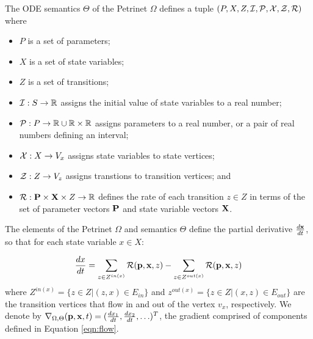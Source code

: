 \begin{definition}
    The ODE semantics $\Theta$ of the Petrinet $\Omega$ defines a tuple $(P, X,
    Z, {\cal I}, {\cal P}, {\cal X}, {\cal Z}, {\cal R})$ where 
    \begin{itemize}
        \item $P$ is a set of parameters;
        \item $X$ is a set of state variables;
        \item $Z$ is a set of transitions;
        \item ${\cal I}: S \rightarrow {\mathbb{R}}$ assigns the initial value of
        state variables to a real number;
        \item ${\cal P}: P \rightarrow {\mathbb{R}} \cup {\mathbb{R}} \times {\mathbb{R}}$ assigns
        parameters to a real number, or a pair of real numbers defining an
        interval;
        \item ${\cal X}: X \rightarrow V_x$ assigns state variables to state
        vertices;
        \item ${\cal Z}: Z \rightarrow V_z$ assigns transtions to transition
        vertices; and
        \item ${\cal R}: {\bf P} \times {\bf X} \times Z \rightarrow {\mathbb{R}}$
        defines the rate of each transition  $z \in Z$ in terms of the set of
        parameter vectors ${\bf P}$ and state variable vectors ${\bf X}$.  
    \end{itemize}
    The elements of the Petrinet $\Omega$ and semantics $\Theta$ define the
    partial derivative $\frac{d {\bf x}}{dt}$, so that for each state variable
    $x \in X$:
    
    \begin{equation}\label{eqn:flow}
        \frac{dx}{dt} = \sum_{z \in Z^{in(x)}} {\cal R}({\bf p}, {\bf x}, z) - \sum_{z \in Z^{out(x)} } {\cal R}({\bf p}, {\bf x}, z)
    \end{equation}
\noindent where $Z^{in(x)} = \{z \in Z | (z, x) \in E_{in}\}$ and
    $z^{out(x)}=\{z \in Z| (x, z) \in E_{out}\}$ are the transition
    vertices that flow in and out of the vertex $v_x$, respectively. We denote
    by $\nabla_{\Omega, \Theta}({\bf p}, {\bf x}, t) = (\frac{dx_1}{dt},
    \frac{dx_2}{dt}, \ldots)^T$, the gradient comprised of components defined in
    Equation \eqref{eqn:flow}.
\end{definition}

